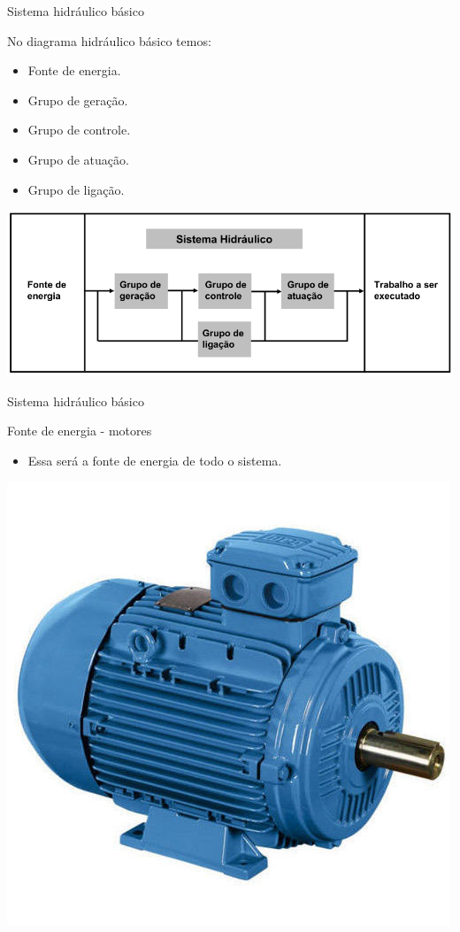 \begin{frame}{Sistema hidráulico básico}
	\begin{block}{}
		No diagrama hidráulico básico temos:
		\begin{itemize}
			\item Fonte de energia.
			\item Grupo de geração.
			\item Grupo de controle.
			\item Grupo de atuação.
			\item Grupo de ligação.
		\end{itemize}
	\end{block}

	\medskip
	\centering
	
	\includegraphics[width=0.7\linewidth]{Figuras/Ch15/fig7}

\end{frame}


\begin{frame}{Sistema hidráulico básico}
	\begin{block}{Fonte de energia - motores}
		\begin{itemize}
			\item Essa será a fonte de energia de todo o sistema.
		\end{itemize}
	\end{block}
	
	\centering
	\includegraphics[width=0.55\linewidth]{Figuras/Ch15/fig8}
	
\end{frame}



